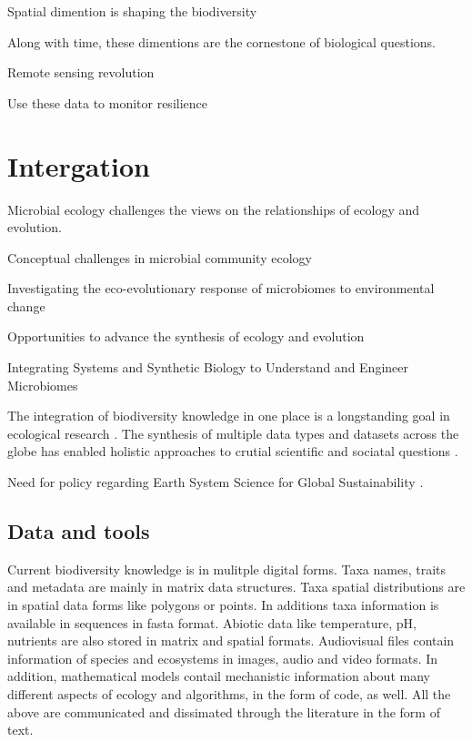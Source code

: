 Spatial dimention is shaping the biodiversity

Along with time, these dimentions are the cornestone of 
biological questions. 


Remote sensing revolution

Use these data to monitor resilience \cite{Lenton2022resilience}

\section{Intergation}
\label{sec:crete-integration}

Microbial ecology challenges the views on the relationships of ecology and evolution.

Conceptual challenges in microbial community ecology \cite{prosser2020Conceptual}

Investigating the eco-evolutionary response of microbiomes to environmental change \cite{martiny2023Investigating}

Opportunities to advance the synthesis of ecology and evolution \cite{loreau2023Opportunities}

Integrating Systems and Synthetic Biology to Understand and Engineer Microbiomes \cite{Leggieri2021}

The integration of biodiversity knowledge in one place is a longstanding
goal in ecological research \cite{Walter_2012}. The synthesis of multiple
data types and datasets across the globe has enabled 
holistic approaches to crutial scientific and sociatal questions \cite{heberling_j_mason_data_2021}.

Need for policy regarding Earth System Science for Global
Sustainability \cite{reid2010earth}.

\subsection{Data and tools}
\label{sec:data-tools}

Current biodiversity knowledge is in mulitple digital forms. 
Taxa names, traits and metadata are mainly in matrix data
structures. Taxa spatial distributions are in spatial data
forms like polygons or points. In additions taxa information
is available in sequences in fasta format. Abiotic data like 
temperature, pH, nutrients are also stored in matrix
and spatial formats. Audiovisual files contain information
of species and ecosystems in images, audio and video formats.
In addition, mathematical models contail mechanistic information
about many different aspects of ecology and algorithms, in the 
form of code, as well. All the above are communicated and dissimated through the
literature in the form of text.

